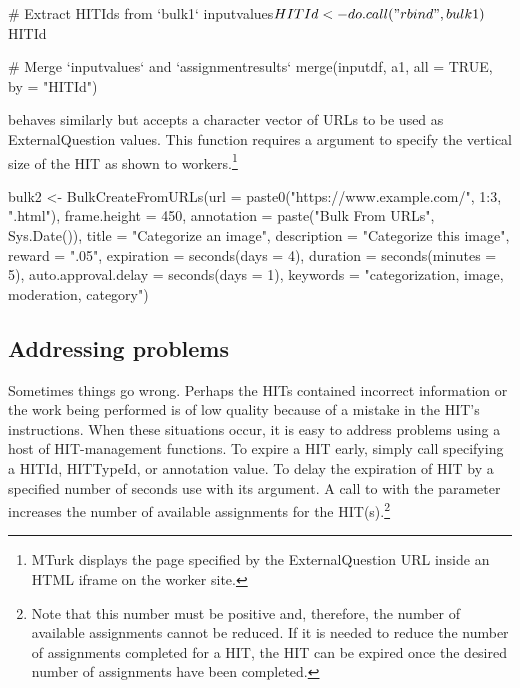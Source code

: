 \begin{example}
# Extract HITIds from `bulk1`
inputvalues$HITId <- do.call("rbind", bulk1)$HITId

# Merge `inputvalues` and `assignmentresults`
merge(inputdf, a1, all = TRUE, by = "HITId")
\end{example}

 behaves similarly but accepts a character vector of URLs to be used as ExternalQuestion values. This function requires a  argument to specify the vertical size of the HIT as shown to workers.\footnote{MTurk displays the page specified by the ExternalQuestion URL inside an HTML iframe on the worker site.}


\begin{example}
bulk2 <- 
  BulkCreateFromURLs(url = paste0("https://www.example.com/", 1:3, ".html"),
                     frame.height = 450,
                     annotation = paste("Bulk From URLs", Sys.Date()),
                     title = "Categorize an image",
                     description = "Categorize this image",
                     reward = ".05",
                     expiration = seconds(days = 4),
                     duration = seconds(minutes = 5),
                     auto.approval.delay = seconds(days = 1),
                     keywords = "categorization, image, moderation, category")
\end{example}



\subsection{Addressing problems}

Sometimes things go wrong. Perhaps the HITs contained incorrect information or the work being performed is of low quality because of a mistake in the HIT's instructions. When these situations occur, it is easy to address problems using a host of HIT-management functions. To expire a HIT early, simply call  specifying a HITId, HITTypeId, or annotation value. To delay the expiration of HIT by a specified number of seconds use  with its  argument. A call to  with the  parameter increases the number of available assignments for the HIT(s).\footnote{Note that this number must be positive and, therefore, the number of available assignments cannot be reduced. If it is needed to reduce the number of assignments completed for a HIT, the HIT can be expired once the desired number of assignments have been completed.}

